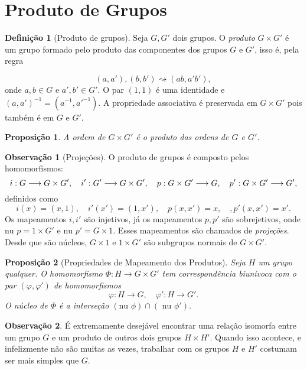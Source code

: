 \documentclass[a4paper,12pt]{report}
\theoremstyle{plain}
\newtheorem{proposicao}{Proposição}[section]
\theoremstyle{definition}
\newtheorem{definicao}{Definição}[section]
\newtheorem{observacao}{Observação}[section]
\begin{document}
\section{Produto de Grupos}

\begin{definicao}[Produto de grupos]
	Seja \(G,G'\) dois grupos. O \emph{produto}
	\(G\times G'\) é um grupo formado pelo produto das componentes dos
	grupos \(G\) e \(G'\), isso é, pela regra
	
	\[ (a,a'), (b,b') \rightsquigarrow (ab,a'b'), \] onde \(a,b \in G\) e
	\(a',b'\in G'\). O par \((1,1)\) é uma identidade e
	\((a,a')^{-1} = (a^{-1},a'^{-1})\). A propriedade associativa é
	preservada em \(G\times G'\) pois também é em \(G\) e \(G'\).
\end{definicao}

\begin{proposicao}
	A ordem de \(G\times G'\) é o produto das ordens de
	\(G\) e \(G'\).	
\end{proposicao}

\begin{observacao}[Projeções]
	O produto de grupos é composto pelos homomorfismos:
	\[i: G\longrightarrow G\times G', \quad i': G'\longrightarrow G\times G', \newline \quad p: G\times G'\longrightarrow G, \quad p': G\times G'\longrightarrow G',\]
	definidos como
	\[i(x) = (x,1), \quad i'(x') = (1,x'), \quad p(x,x') = x, \quad, p'(x,x') = x'.\]
	Os mapeamentos \(i,i'\) são injetivos, já os mapeamentos \(p,p'\) são
	sobrejetivos, onde \(\text{nu }p = 1\times G'\) e
	\(\text{nu }p' = G\times 1\). Esses mapeamentos são chamados de
	\emph{projeções}. Desde que são núcleos, \(G\times 1\) e \(1\times G'\)
	são subgrupos normais de \(G\times G'\).
\end{observacao}

\begin{proposicao}[Propriedades de Mapeamento dos Produtos]
	Seja
	\(H\) um grupo qualquer. O homomorfismo
	\(\Phi: H\longrightarrow G\times G'\) tem correspondência biunívoca com
	o par \((\varphi, \varphi')\) de homomorfismos
	\[\varphi:H\longrightarrow G, \quad \varphi': H\longrightarrow G'.\]
	O núcleo de \(\Phi\) é a interseção
	\((\text{nu }\phi)\cap(\text{ nu }\phi').\)	
\end{proposicao}

\begin{observacao}
	É extremamente desejável encontrar uma relação isomorfa entre um grupo
	\(G\) e um produto de outros dois grupos \(H\times H'\). Quando isso
	acontece, e infelizmente não são muitas as vezes, trabalhar com os
	grupos \(H\) e \(H'\) costumam ser mais simples que \(G\).
\end{observacao}
\end{document}

